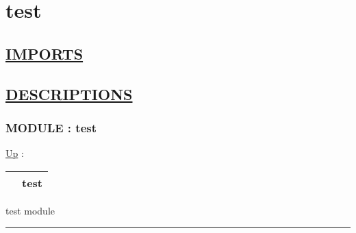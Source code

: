 \chapter*{test}
\hypertarget{ecldoc:toc:test}{}

\section*{\underline{IMPORTS}}

\section*{\underline{DESCRIPTIONS}}
\subsection*{MODULE : test}
\hypertarget{ecldoc:test}{}
\hyperlink{ecldoc:toc:root}{Up} :

{\renewcommand{\arraystretch}{1.5}
\begin{tabularx}{\textwidth}{|>{\raggedright\arraybackslash}l|X|}
\hline
\hspace{0pt} & test \\
\hline
\end{tabularx}
}

\par
test module


\rule{\linewidth}{0.5pt}
